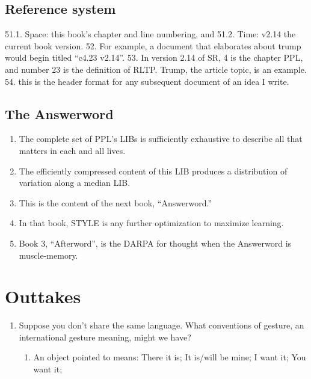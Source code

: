 \documentclass[
]{book}
\providecommand{\tightlist}{%
  \setlength{\itemsep}{0pt}\setlength{\parskip}{0pt}}
\begin{document}
\hypertarget{reference-system}{%
\subsection{Reference system}\label{reference-system}}

51.1. Space: this book's chapter and line numbering, and
51.2. Time: v2.14 the current book version.
52. For example, a document that elaborates about trump would begin titled ``c4.23 v2.14''.
53. In version 2.14 of SR, 4 is the chapter PPL, and number 23 is the definition of RLTP. Trump, the article topic, is an example.
54. this is the header format for any subsequent document of an idea I write.

\hypertarget{the-answerword}{%
\subsection{The Answerword}\label{the-answerword}}

\begin{enumerate}
\def\labelenumi{\arabic{enumi}.}
\setcounter{enumi}{54}
\item
  The complete set of PPL's LIBs is sufficiently exhaustive to describe all that matters in each and all lives.
\item
  The efficiently compressed content of this LIB produces a distribution of variation along a median LIB.
\item
  This is the content of the next book, ``Answerword.''
\item
  In that book, STYLE is any further optimization to maximize learning.
\item
  Book 3, ``Afterword'', is the DARPA for thought when the Answerword is muscle-memory.
\end{enumerate}

\hypertarget{outtakes}{%
\section{Outtakes}\label{outtakes}}

\begin{enumerate}
\def\labelenumi{\arabic{enumi}.}
\setcounter{enumi}{59}
\tightlist
\item
  Suppose you don't share the same language. What conventions of gesture, an international gesture meaning, might we have?

  \begin{enumerate}
  \def\labelenumii{\arabic{enumii}.}
  \tightlist
  \item
    An object pointed to means: There it is; It is/will be mine; I want it; You want it;
  \end{enumerate}
\end{enumerate}
\end{document}
